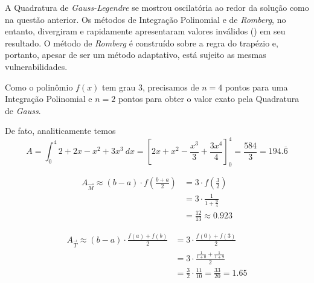 \documentclass{homework}
\begin{document}
	A Quadratura de \textit{Gauss-Legendre} se mostrou oscilatória ao redor da solução como na questão anterior. Os métodos de Integração Polinomial e de \textit{Romberg}, no entanto, divergiram e rapidamente apresentaram valores inválidos () em seu resultado. O método de \textit{Romberg} é construído sobre a regra do trapézio e, portanto, apesar de ser um método adaptativo, está sujeito as mesmas vulnerabilidades.
	
	\quest[Com o programa desenvolvido, use o número mínimo de pontos de integração para integrar exatamente a integral abaixo pelos métodos da Integração Polinomial e da Quadratura de \textit{Gauss}.%
	$$f(x) = 2 + 2x - x^2 + 3x^3$$%
	$$\displaystyle A = \int_{0}^{4} f(x)~dx$$]%

	Como o polinômio $f(x)$ tem grau 3, precisamos de $n = 4$ pontos para uma Integração Polinomial e $n = 2$ pontos para obter o valor exato pela Quadratura de \textit{Gauss}.

	
	
	De fato, analiticamente temos%
	$$A = \int_{0}^{4} 2 + 2x - x^2 + 3x^3~dx = \left[2x + x^2 - \frac{x^3}{3} + \frac{3x^4}{4}\right]_0^4 = \frac{584}{3} = 194.\overline{6}$$
	

	\begin{align*}
		A_\vec{M} \approx (b - a) \cdot f\left(\frac{b + a}{2}\right) &= 3 \cdot f\left(\frac{3}{2}\right)\\
		&= \displaystyle 3 \cdot \frac{1}{1 + \frac{9}{4}}\\
		&= \frac{12}{13} \approx 0.923
	\end{align*}
	
	\begin{align*}
		A_\vec{T} \approx (b - a) \cdot \frac{f(a) + f(b)}{2} &= 3 \cdot \frac{f(0) + f(3)}{2}\\
		&= \displaystyle 3 \cdot \frac{\frac{1}{1 + 0} + \frac{1}{1 + 9}}{2}\\
		&= \frac{3}{2} \cdot \frac{11}{10} = \frac{33}{20} = 1.65
	\end{align*}
	
\end{document}
